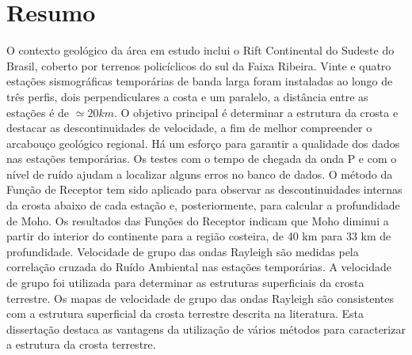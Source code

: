 \chapter*{Resumo}	

O contexto geológico da área em estudo inclui o Rift Continental do Sudeste do Brasil, coberto por terrenos policíclicos do sul da Faixa Ribeira. Vinte e quatro estações sismográficas temporárias de banda larga foram instaladas ao longo de três perfis, dois perpendiculares a costa e um paralelo, a distância entre as estações é de $\simeq 20 km$.  O objetivo principal é determinar a estrutura da crosta e destacar as descontinuidades de velocidade, a fim de melhor compreender o arcabouço geológico regional. Há um esforço para garantir a qualidade dos dados nas estações temporárias. Os testes com o tempo de chegada da onda P e com o nível de ruído ajudam a localizar alguns erros no banco de dados. O método da Função de Receptor tem sido aplicado para observar as descontinuidades internas da crosta abaixo de cada estação e, posteriormente, para calcular a profundidade de Moho. Os resultados das Funções do Receptor indicam que Moho diminui a partir do interior do continente para a região costeira, de 40 km para 33 km de profundidade. Velocidade de grupo das ondas Rayleigh são medidas pela correlação cruzada do Ruído Ambiental nas estações temporárias. A velocidade de grupo foi utilizada para determinar as estruturas superficiais da crosta terrestre. Os mapas de velocidade de grupo das ondas Rayleigh são consistentes com a estrutura superficial da crosta terrestre descrita na literatura. Esta dissertação destaca as vantagens da utilização de vários métodos para caracterizar a estrutura da crosta terrestre.